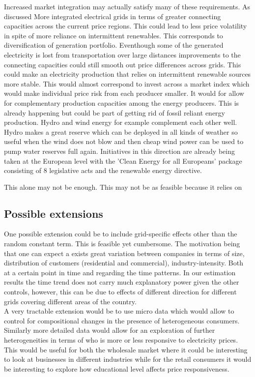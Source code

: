Increased market integration may actually satisfy many of these requirements. As discussed  More integrated electrical grids in terms of greater connecting capacities across the current price regions. This could lead to less price volatility in spite of more reliance on intermittent renewables. This corresponds to diversification of generation portfolio.  Eventhough some of the generated electricity is lost from transportation over large distances improvements to the connecting capacities could still smooth out price differences across grids. This could make an electricity production that relies on intermittent renewable sources more stable. This would almost correspond to invest across a market index which would make individual price risk from each producer smaller. It would for allow for complementary production capacities among the energy producers. This is already happening but could be part of getting rid of fossil reliant energy production. Hydro and wind energy for example complement each other well. Hydro makes a great reserve which can be deployed in all kinds of weather so useful when the wind does not blow and then cheap wind power can be used to pump water reserves full again. Initiatives in this direction are already being taken at the European level with the 'Clean Energy for all Europeans' package consisting of 8 legislative acts and the renewable energy directive.

This alone may not be enough. This may not be as feasible because it relies on



\subsection{Possible extensions}
\label{subsec:r_extensions}
One possible extension could be to include grid-specific effects other than the random constant term. This is feasible yet cumbersome. The motivation being that one can expect a exists great variation between companies in terms of size, distribution of customers (residential and commercial), industry-intensity. Both at a certain point in time and regarding the time patterns. In our estimation results the time trend does not carry much explanatory power given the other controls, however, this can be due to effects of different direction for different grids covering different areas of the country.
\medskip\\
A very tractable extension would be to use micro data which would allow to control for compositional changes in the presence of heterogeneous consumers. Similarly more detailed data would allow for an exploration of further heterogeneities in terms of who is more or less responsive to electricity prices. This would be useful for both the wholesale market where it could be interesting to look at businesses in different industries while for the retail consumers it would be interesting to explore how educational level affects price responsiveness.
